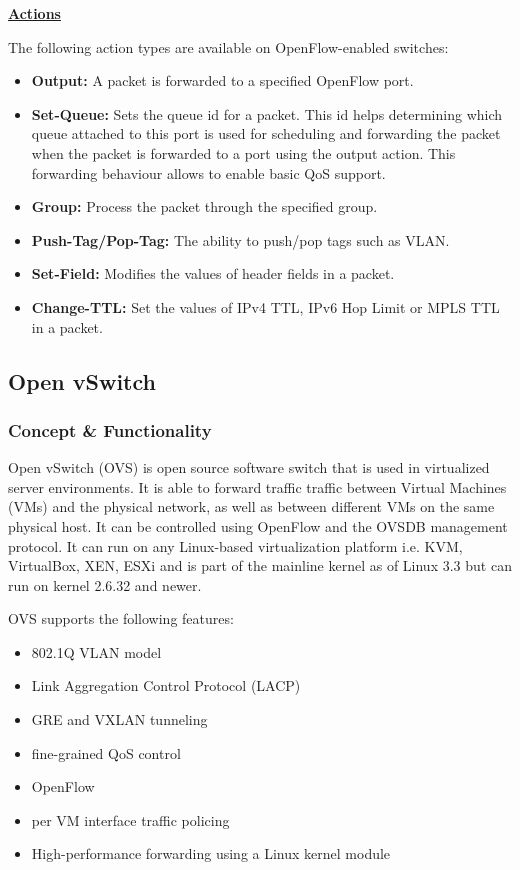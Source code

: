 \underline{\textbf{Actions}}

The following action types are available on OpenFlow-enabled switches:
\begin{itemize}
\item \textbf{Output:} A packet is forwarded to a specified OpenFlow port.
\item \textbf{Set-Queue:} Sets the queue id for a packet. This id helps determining which queue attached to this port is used for scheduling and forwarding the packet when the packet is forwarded to a port using the output action. This forwarding behaviour allows to enable basic QoS support.
\item \textbf{Group:} Process the packet through the specified group.
\item \textbf{Push-Tag/Pop-Tag:} The ability to push/pop tags such as VLAN.
\item \textbf{Set-Field:} Modifies the values of header fields in a packet.
\item \textbf{Change-TTL:} Set the values of IPv4 TTL, IPv6 Hop Limit or MPLS TTL in a packet.
\end{itemize} 

\subsection{Open vSwitch}

\subsubsection{Concept \& Functionality}

Open vSwitch (OVS) is open source software switch that is used in virtualized server environments. It is able to forward traffic traffic between Virtual Machines (VMs) and the physical network, as well as between different VMs on the same physical host. It can be controlled using OpenFlow and the OVSDB management protocol. It can run on any Linux-based virtualization platform i.e. KVM, VirtualBox, XEN, ESXi and is part of the mainline kernel as of Linux 3.3 but can run on kernel 2.6.32 and newer.

OVS supports the following features:
\begin{itemize}
\item 802.1Q VLAN model
\item Link Aggregation Control Protocol (LACP)
\item GRE and VXLAN tunneling
\item fine-grained QoS control
\item OpenFlow
\item per VM interface traffic policing
\item High-performance forwarding using a Linux kernel module
\end{itemize}

